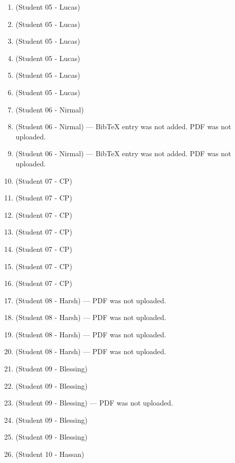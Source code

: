 \begin{enumerate}[label=\#\arabic*]
\item \cite{morita1988reconstruction} (Student 05 - Lucas)
\item \cite{kiyasu1995measurement} (Student 05 - Lucas)
\item \cite{dehnhardt1988universal} (Student 05 - Lucas)
\item \cite{ali1989pseudorandom} (Student 05 - Lucas)
\item \cite{jia2011construction} (Student 05 - Lucas)
\item \cite{ozturk1996generation} (Student 05 - Lucas)
\item \cite{grubman2016partitioning} (Student 06 - Nirmal)
\item \cite{hales2009directed} (Student 06 - Nirmal) --- BibTeX entry was not added. PDF was not uploaded.
\item \cite{muggli2017succinct} (Student 06 - Nirmal) --- BibTeX entry was not added. PDF was not uploaded.
\item \cite{zach2025puzzlepoles} (Student 07 - CP)
\item \cite{schmid2022determining} (Student 07 - CP)
\item \cite{etzion2011sequence} (Student 07 - CP)
\item \cite{fang2015one} (Student 07 - CP)
\item \cite{spoelder1998some} (Student 07 - CP)
\item \cite{goubin2004construction} (Student 07 - CP)
\item \cite{marcovich2023zero} (Student 07 - CP)
\item \cite{morita1988two} (Student 08 - Harsh) --- PDF was not uploaded.
\item \cite{etzion2007tilings} (Student 08 - Harsh) --- PDF was not uploaded.
\item \cite{vuylsteke1990range} (Student 08 - Harsh) --- PDF was not uploaded.
\item \cite{bomer1990perfect} (Student 08 - Harsh) --- PDF was not uploaded.
\item \cite{paterson1994perfect} (Student 09 - Blessing)
\item \cite{ulusoy2009one} (Student 09 - Blessing)
\item \cite{fredricksen1992new} (Student 09 - Blessing) --- PDF was not uploaded.
\item \cite{chee2024bruijn} (Student 09 - Blessing)
\item \cite{blackburn2026bruijn} (Student 09 - Blessing)
\item \cite{siu1997combinatorics} (Student 10 - Hassan)

\end{enumerate}

